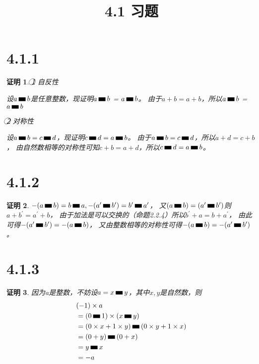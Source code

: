 \documentclass{article}
\theoremstyle{mystyle}
\theoremstyle{zproofstyle}
\newtheorem*{zproof}{证明}
\newcommand{\zsub}{\mathbin{\rule{1em}{0.5em}}}
\begin{document}
\title{4.1 习题}
\maketitle

\section*{4.1.1}
\begin{zproof}
  \textcircled{1} 自反性

  设$a \zsub b$是任意整数，现证明$a \zsub b$ = $a \zsub b$。
  由于$a+b=a+b$，所以$a \zsub b$ = $a \zsub b$

  \textcircled{2} 对称性

  设$a \zsub b = c \zsub d$，现证明$c \zsub d=a \zsub b$。
  由于$a \zsub b = c \zsub d$，所以$a+d=c+b$，
  由自然数相等的对称性可知$c+b=a+d$，所以$c \zsub d=a \zsub b$。
\end{zproof}

\section*{4.1.2}
\begin{zproof}
  $-(a \zsub b)=b \zsub a,-(a^\prime \zsub b^\prime)=b^\prime \zsub a^\prime$，
  又$(a \zsub b)=(a^\prime \zsub b^\prime)$则$a+b^\prime = a^\prime + b$，
  由于加法是可以交换的（命题2.2.4）所以$b^\prime + a = b + a^\prime$，
  由此可得$-(a^\prime \zsub b^\prime)=-(a \zsub b)$，
  又由整数相等的对称性可得$-(a \zsub b)=-(a^\prime \zsub b^\prime)$。
\end{zproof}

\section*{4.1.3}
\begin{zproof}
  因为a是整数，不妨设$a = x \zsub y$，其中$x, y$是自然数，则
  \begin{align*}
     & (-1) \times a                                               \\
     & =(0 \zsub 1) \times (x \zsub y)                             \\
     & = (0 \times x + 1 \times y) \zsub (0 \times y + 1 \times x) \\
     & = (0 + y) \zsub (0 + x)                                     \\
     & = y \zsub x                                                 \\
     & = -a
  \end{align*}
\end{zproof}
\end{document}
